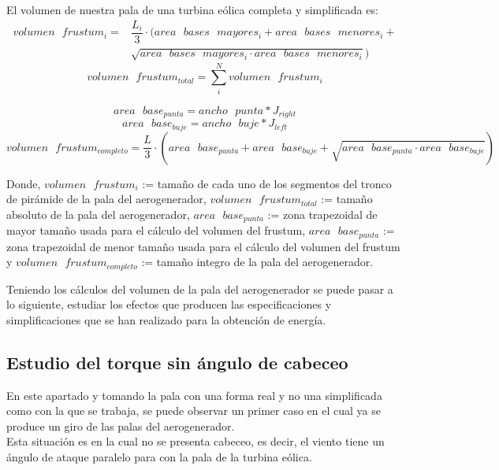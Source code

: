 \begin{definicion}
El volumen de nuestra pala de una turbina eólica completa y simplificada es:
    \begin{align*}
        volumen \text{ } frustum_i = & \dfrac{L_i}{3} \cdot (area \text{ } bases \text{ } mayores_i + area \text{ } bases \text{ } menores_i + \\
        & \sqrt{area \text{ } bases \text{ } mayores_i \cdot area \text{ } bases \text{ } menores_i})
    \end{align*}
$$ volumen \text{ } frustum_{total} = \sum_{i}^{N}volumen \text{ } frustum_i  $$

$$ area \text{ } base_{punta} = ancho \text{ } punta * J_{right} $$
$$ area \text{ } base_{buje} = ancho \text{ } buje * J_{left} $$
$$ volumen \text{ } frustum_{completo} = \dfrac{L}{3} \cdot ( area \text{ } base_{punta} + area \text{ } base_{buje} + \sqrt{area \text{ } base_{punta} \cdot area \text{ } base_{buje}} ) $$


Donde,
\centering $ volumen \text{ } frustum_i $ := tamaño de cada uno de los segmentos del tronco de pirámide de la pala del aerogenerador, $ volumen \text{ } frustum_{total} $ := tamaño absoluto de la pala del aerogenerador, $area \text{ } base_{punta}$ := zona trapezoidal de mayor tamaño usada para el cálculo del volumen del frustum, $area \text{ } base_{punta}$ := zona trapezoidal de menor tamaño usada para el cálculo del volumen del frustum y $ volumen \text{ } frustum_{completo} $ := tamaño integro de la pala del aerogenerador.
\label{def:volumen_tronco_frustum}
\end{definicion}


Teniendo los cálculos del volumen de la pala del aerogenerador se puede pasar a lo siguiente, estudiar los efectos que producen las especificaciones y simplificaciones que se han realizado para la obtención de energía.


\subsection{Estudio del torque sin ángulo de cabeceo}
\label{section:torque_pala_horizontal}
En este apartado y tomando la pala con una forma real y no una simplificada como con la que se trabaja, se puede observar un primer caso en el cual ya se produce un giro de las palas del aerogenerador. \\

Esta situación es en la cual no se presenta cabeceo, es decir, el viento tiene un ángulo de ataque paralelo para con la pala de la turbina eólica. \\


